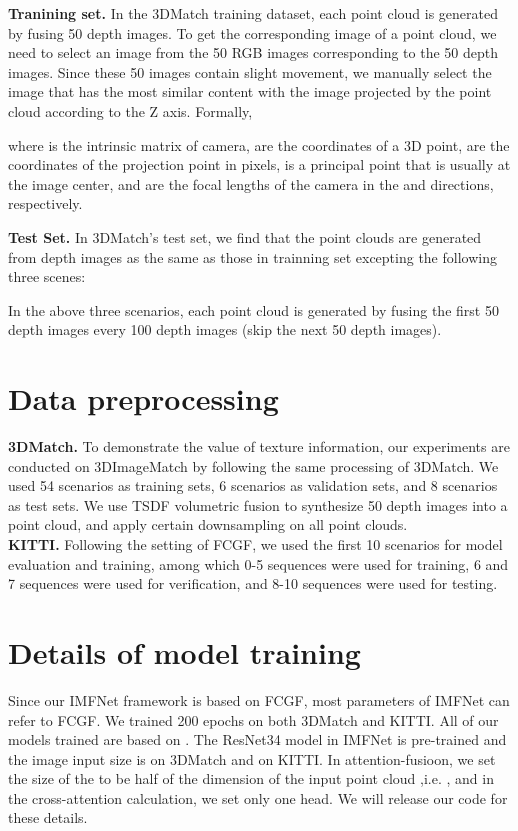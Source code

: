 \documentclass[10pt,twocolumn,letterpaper]{article}
\begin{document}
\indent \textbf{Tranining set.} In the 3DMatch training dataset, each point cloud is generated by fusing 50 depth images. To get the corresponding image of a point cloud, we need to select an image from the 50 RGB images corresponding to the 50 depth images. Since these 50 images contain slight movement, we manually select the image that has the most similar  content with the image projected by the point cloud according to the Z axis. Formally,



where  is the intrinsic matrix of camera,  are the coordinates of a 3D point,  are the coordinates of the projection point in pixels,  is a principal point that is usually at the image center,  and  are the focal lengths of the camera in the  and  directions, respectively. 

\indent \textbf{Test Set.} In 3DMatch's test set, we find that the point clouds  are generated from depth images as the same as those in trainning set excepting the following three scenes: 



In the above three scenarios, each point cloud is generated by fusing the first 50 depth images every 100 depth images (skip the next 50 depth images).

\section{Data preprocessing}
\label{3}
\textbf{3DMatch.} To demonstrate the value of texture information, our experiments are conducted on 3DImageMatch by following the same processing of 3DMatch. We used 54 scenarios as training sets, 6 scenarios as validation sets, and 8 scenarios as test sets. We use TSDF volumetric fusion to synthesize 50 depth images into a point cloud, and apply certain downsampling on all point clouds.\\
\indent \textbf{KITTI.} Following the setting of FCGF, we used the first 10 scenarios for model evaluation and training, among which 0-5 sequences were used for training, 6 and 7 sequences were used for verification, and 8-10 sequences were used for testing.

\section{Details of model training}
\label{4}
Since our IMFNet framework is based on FCGF, most parameters of IMFNet can refer to FCGF. We trained 200 epochs on both 3DMatch and KITTI. All of our models trained are based on . The ResNet34 model in IMFNet is pre-trained and the image input size is  on 3DMatch and  on KITTI. In attention-fusioon, we set the size of the  to be half of the dimension of the input point cloud ,i.e. , and in the cross-attention calculation, we set only one head. We will release our code for these details.
\end{document}
